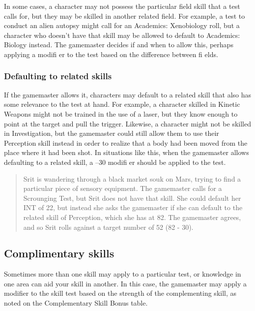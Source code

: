 In some cases, a character may not possess the particular field skill that a test calls for, but they may be skilled in another related field. For example, a test to conduct an alien autopsy might call for an Academics: Xenobiology roll, but a character who doesn’t have that skill may be allowed to default to Academics: Biology instead. The gamemaster decides if and when to allow this, perhaps applying a modifi er to the test based on the difference between fi elds.


\subsubsection{Defaulting to related skills}
\label{sec:skills:defaulting-to-related-skills}

If the gamemaster allows it, characters may default to a related skill that also has some relevance to the test at hand. For example, a character skilled in Kinetic Weapons might not be trained in the use of a laser, but they know enough to point at the target and pull the trigger. Likewise, a character might not be skilled in Investigation, but the gamemaster could still allow them to use their Perception skill instead in order to realize that a body had been moved from the place where it had been shot. In situations like this, when the gamemaster allows defaulting to a related skill, a –30 modifi er should be applied to the test.

\begin{quotation}
Srit is wandering through a black market souk on Mars, trying to find a particular piece of sensory equipment. The gamemaster calls for a Scrounging Test, but Srit does not have that skill. She could default her INT of 22, but instead she asks the gamemaster if she can default to the related skill of Perception, which she has at 82. The gamemaster agrees, and so Srit rolls against a target number of 52 (82 - 30).
\end{quotation}



\subsection{Complimentary skills}
\label{sec:skills:complimentary-skills}

Sometimes more than one skill may apply to a particular test, or knowledge in one area can aid your skill in another. In this case, the gamemaster may apply a modifier to the skill test based on the strength of the complementing skill, as noted on the Complementary
Skill Bonus table.

